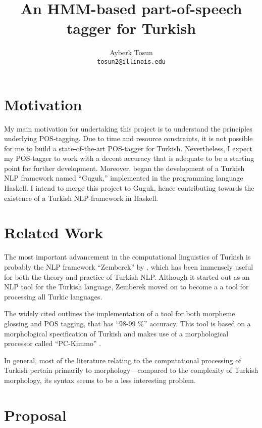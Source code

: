 \documentclass{article}
\title{\bf An HMM-based part-of-speech tagger for Turkish}
\author{Ayberk Tosun\\\texttt{tosun2@illinois.edu}}
\date{}
\begin{document}
\maketitle

\section{Motivation}
\label{sec:motivation}
My main motivation for undertaking this project is to understand the
principles underlying POS-tagging. Due to time and resource constraints, it is
not possible for me to build a state-of-the-art POS-tagger for
Turkish. Nevertheless, I expect my POS-tagger
to work with a decent accuracy that is adequate to be a starting point for
further development. Moreover, \citet{Korkut2015} began the development of a
Turkish NLP framework named ``Guguk,'' implemented in the programming language Haskell. I intend
to merge this project to Guguk, hence contributing towards
the existence of a Turkish NLP-framework in Haskell.

\section{Related Work}
\label{sec:related_work}

The most important advancement in the computational linguistics of Turkish is
probably the NLP framework ``Zemberek'' by \citet{akin2007zemberek}, which has been
immensely useful for both the theory and practice of Turkish NLP. Although it started
out as an NLP tool for the Turkish language, Zemberek moved on to become a
a tool for processing all Turkic languages.

The widely cited \citet{oflazer1994tagging} outlines the implementation of a
tool for both morpheme glossing and POS tagging, that has ``98-99 \%'' accuracy. This
tool is based on a morphological specification of Turkish and makes use of a
morphological processor called ``PC-Kimmo'' \citep{antworth1991pc}.

In general, most of the literature relating to the computational processing of Turkish
pertain primarily to morphology---compared to the complexity of Turkish
morphology, its syntax seems to be a less interesting problem.
\section{Proposal}
\end{document}
